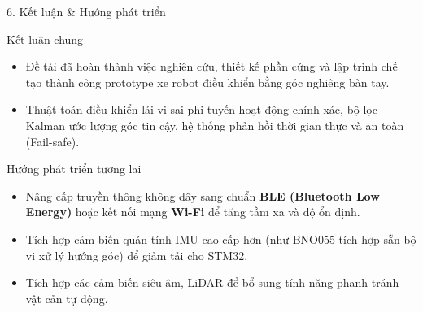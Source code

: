 \documentclass[aspectratio=169, 10pt]{beamer}
\begin{document}
\begin{frame}{6. Kết luận \& Hướng phát triển}
  \begin{block}{Kết luận chung}
    \begin{itemize}
      \item Đề tài đã hoàn thành việc nghiên cứu, thiết kế phần cứng và lập trình chế tạo thành công prototype xe robot điều khiển bằng góc nghiêng bàn tay.
      \item Thuật toán điều khiển lái vi sai phi tuyến hoạt động chính xác, bộ lọc Kalman ước lượng góc tin cậy, hệ thống phản hồi thời gian thực và an toàn (Fail-safe).
    \end{itemize}
  \end{block}
  \begin{block}{Hướng phát triển tương lai}
    \begin{itemize}
      \item Nâng cấp truyền thông không dây sang chuẩn \textbf{BLE (Bluetooth Low Energy)} hoặc kết nối mạng \textbf{Wi-Fi} để tăng tầm xa và độ ổn định.
      \item Tích hợp cảm biến quán tính IMU cao cấp hơn (như BNO055 tích hợp sẵn bộ vi xử lý hướng góc) để giảm tải cho STM32.
      \item Tích hợp các cảm biến siêu âm, LiDAR để bổ sung tính năng phanh tránh vật cản tự động.
    \end{itemize}
  \end{block}
\end{frame}


\end{document}
